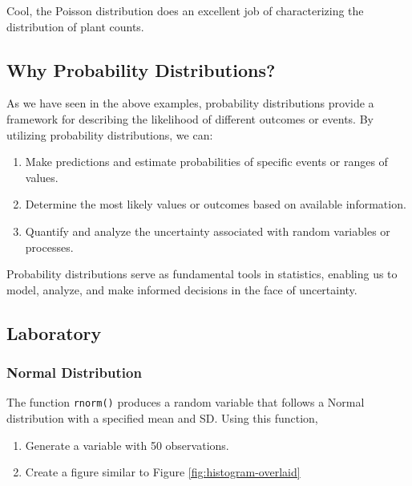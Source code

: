 \documentclass[
]{article}
\providecommand{\tightlist}{%
  \setlength{\itemsep}{0pt}\setlength{\parskip}{0pt}}
\begin{document}
Cool, the Poisson distribution does an excellent job of characterizing the distribution of plant counts.

\hypertarget{why-probability-distributions}{%
\subsection{Why Probability Distributions?}\label{why-probability-distributions}}

As we have seen in the above examples, probability distributions provide a framework for describing the likelihood of different outcomes or events. By utilizing probability distributions, we can:

\begin{enumerate}
\def\labelenumi{\arabic{enumi}.}
\tightlist
\item
  Make predictions and estimate probabilities of specific events or ranges of values.
\item
  Determine the most likely values or outcomes based on available information.
\item
  Quantify and analyze the uncertainty associated with random variables or processes.
\end{enumerate}

Probability distributions serve as fundamental tools in statistics, enabling us to model, analyze, and make informed decisions in the face of uncertainty.

\hypertarget{laboratory-2}{%
\subsection{Laboratory}\label{laboratory-2}}

\hypertarget{normal-distribution}{%
\subsubsection{Normal Distribution}\label{normal-distribution}}

The function \texttt{rnorm()} produces a random variable that follows a Normal distribution with a specified mean and SD. Using this function,

\begin{enumerate}
\def\labelenumi{\arabic{enumi}.}
\tightlist
\item
  Generate a variable with 50 observations.
\item
  Create a figure similar to Figure \ref{fig:histogram-overlaid}
\end{enumerate}
\end{document}
